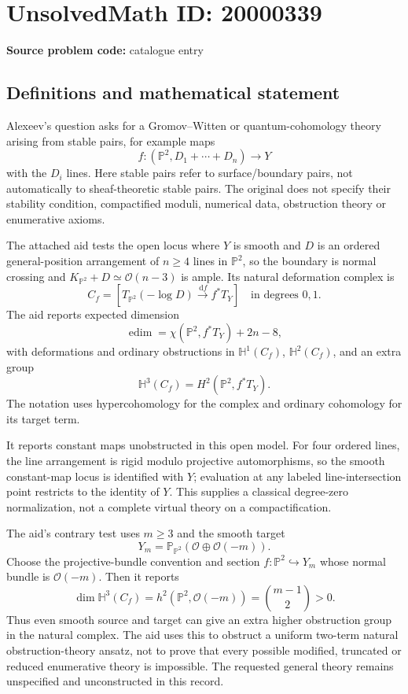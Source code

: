\documentclass[11pt]{article}
\newcommand{\PP}{\mathbb{P}}
\newcommand{\dd}{\,\mathrm{d}}
\begin{document}
\section*{UnsolvedMath ID: 20000339}
\textbf{Source problem code:} catalogue entry
\subsection{Definitions and mathematical statement}
Alexeev's question asks for a Gromov--Witten or quantum-cohomology theory arising from stable pairs, for example maps
\[
f:(\PP^2,D_1+\cdots+D_n)\longrightarrow Y
\]
with the \(D_i\) lines. Here stable pairs refer to surface/boundary pairs, not automatically to sheaf-theoretic stable pairs. The original does not specify their stability condition, compactified moduli, numerical data, obstruction theory or enumerative axioms.

The attached aid tests the open locus where \(Y\) is smooth and \(D\) is an ordered general-position arrangement of \(n\geq4\) lines in \(\PP^2\), so the boundary is normal crossing and \(K_{\PP^2}+D\simeq\mathcal O(n-3)\) is ample. Its natural deformation complex is
\[
C_f=[T_{\PP^2}(-\log D)\xrightarrow{\dd f}f^*T_Y]
\quad\text{in degrees }0,1.
\]
The aid reports expected dimension
\[
\operatorname{edim}=\chi(\PP^2,f^*T_Y)+2n-8,
\]
with deformations and ordinary obstructions in \(\mathbb H^1(C_f)\), \(\mathbb H^2(C_f)\), and an extra group
\[
\mathbb H^3(C_f)=H^2(\PP^2,f^*T_Y).
\]
The notation uses hypercohomology for the complex and ordinary cohomology for its target term.

It reports constant maps unobstructed in this open model. For four ordered lines, the line arrangement is rigid modulo projective automorphisms, so the smooth constant-map locus is identified with \(Y\); evaluation at any labeled line-intersection point restricts to the identity of \(Y\). This supplies a classical degree-zero normalization, not a complete virtual theory on a compactification.

The aid's contrary test uses \(m\geq3\) and the smooth target
\[
Y_m=\PP_{\PP^2}(\mathcal O\oplus\mathcal O(-m)).
\]
Choose the projective-bundle convention and section \(f:\PP^2\hookrightarrow Y_m\) whose normal bundle is \(\mathcal O(-m)\). Then it reports
\[
\dim\mathbb H^3(C_f)=h^2(\PP^2,\mathcal O(-m))
=\binom{m-1}{2}>0.
\]
Thus even smooth source and target can give an extra higher obstruction group in the natural complex. The aid uses this to obstruct a uniform two-term natural obstruction-theory ansatz, not to prove that every possible modified, truncated or reduced enumerative theory is impossible. The requested general theory remains unspecified and unconstructed in this record.
\end{document}
